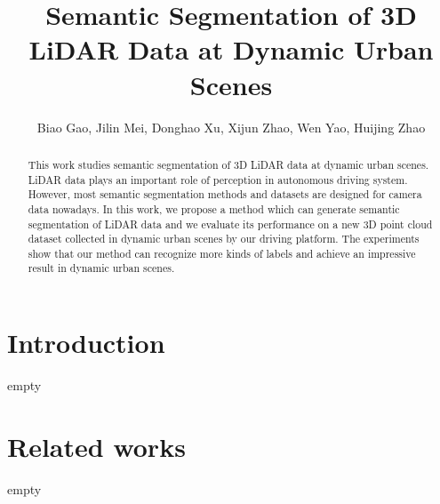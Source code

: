 






\title{Semantic Segmentation of 3D LiDAR Data at Dynamic Urban Scenes}




\author{\authorblockN
	{Biao Gao,
		Jilin Mei, 
		Donghao Xu,
		Xijun Zhao,
		Wen Yao,
		Huijing Zhao}
}



\maketitle

\begin{abstract}
This work studies semantic segmentation of 3D LiDAR data at dynamic urban scenes. LiDAR data plays an important role of perception in autonomous driving system. However, most semantic segmentation methods and datasets are designed for camera data nowadays. In this work, we propose a method which can generate semantic segmentation of LiDAR data and we evaluate its performance on a new 3D point cloud dataset collected in dynamic urban scenes by our driving platform. The experiments show that our method can recognize more kinds of labels and achieve an impressive result in dynamic urban scenes.
\end{abstract}


\section{Introduction}
empty

\section{Related works}
empty

